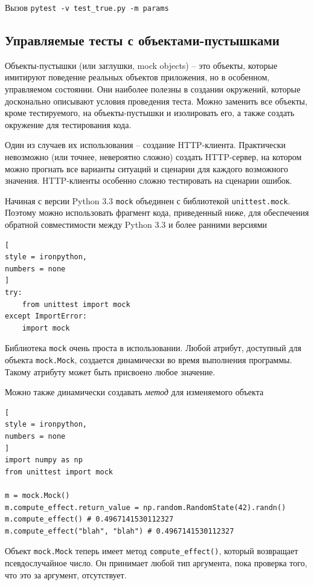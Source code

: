 \documentclass[%
	11pt,
	a4paper,
	utf8,
		]{article}
\begin{document}
Вызов \texttt{pytest -v test\_true.py -m params}

\subsection{Управляемые тесты с объектами-пустышками}

Объекты-пустышки (или заглушки, mock objects) -- это объекты, которые имитируют поведение реальных объектов приложения, но в особенном, управляемом состоянии. Они наиболее полезны в создании окружений, которые досконально описывают условия проведения теста. Можно заменить все объекты, кроме тестируемого, на объекты-пустышки и изолировать его, а также создать окружение для тестирования кода.

Один из случаев их использования -- создание HTTP-клиента. Практически невозможно (или точнее, невероятно сложно) создать HTTP-сервер, на котором можно прогнать все варианты ситуаций и сценарии для каждого возможного значения. HTTP-клиенты особенно сложно тестировать на сценарии ошибок.

Начиная с версии Python 3.3 \texttt{mock} объединен с библиотекой \texttt{unittest.mock}. Поэтому можно использовать фрагмент кода, приведенный ниже, для обеспечения обратной совместимости между Python 3.3 и более ранними версиями
\begin{lstlisting}[
style = ironpython,
numbers = none	
]
try:
    from unittest import mock
except ImportError:
    import mock
\end{lstlisting}

Библиотека \texttt{mock} очень проста в использовании. Любой атрибут, доступный для объекта \texttt{mock.Mock}, создается динамически во время выполнения программы. Такому атрибуту может быть присвоено любое значение.

Можно также динамически создавать \emph{метод} для изменяемого объекта
\begin{lstlisting}[
style = ironpython,
numbers = none	
]
import numpy as np
from unittest import mock

m = mock.Mock()
m.compute_effect.return_value = np.random.RandomState(42).randn()
m.compute_effect() # 0.4967141530112327
m.compute_effect("blah", "blah") # 0.4967141530112327
\end{lstlisting}

Объект \texttt{mock.Mock} теперь имеет метод \texttt{compute\_effect()}, который возвращает псевдослучайное число. Он принимает любой тип аргумента, пока проверка того, что это за аргумент, отсутствует.
\end{document}
